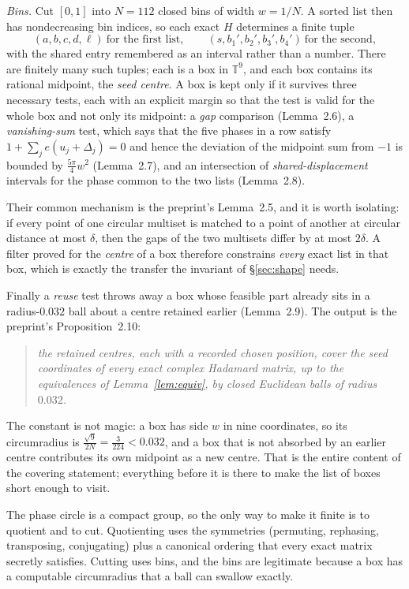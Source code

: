 \documentclass[11pt]{article}
\theoremstyle{definition}
\theoremstyle{plain}
\theoremstyle{definition}
\newenvironment{claim}{\begin{quote}\itshape}{\end{quote}}
\begin{document}
\emph{Bins.} Cut $[0,1]$ into $N=112$ closed bins of width $w=1/N$. A sorted list then has
nondecreasing bin indices, so each exact $H$ determines a finite tuple
\[
(a,b,c,d,\ell)\ \text{for the first list},\qquad (s,b_1',b_2',b_3',b_4')\ \text{for the second},
\]
with the shared entry remembered as an interval rather than a number. There are finitely many such
tuples; each is a box in $\mathbb T^9$, and each box contains its rational midpoint, the \emph{seed
centre}. A box is kept only if it survives three necessary tests, each with an explicit margin so
that the test is valid for the whole box and not only its midpoint:
a \emph{gap} comparison (Lemma~2.6), a \emph{vanishing-sum} test, which says that the five phases in
a row satisfy $1+\sum_j e(u_j+\Delta_j)=0$ and hence the deviation of the midpoint sum from $-1$ is
bounded by $\tfrac{5\pi}{4}w^2$ (Lemma~2.7), and an intersection of \emph{shared-displacement}
intervals for the phase common to the two lists (Lemma~2.8).

Their common mechanism is the preprint's Lemma~2.5, and it is worth isolating: if every point of one
circular multiset is matched to a point of another at circular distance at most $\delta$, then the
gaps of the two multisets differ by at most $2\delta$. A filter proved for the \emph{centre} of a box
therefore constrains \emph{every} exact list in that box, which is exactly the transfer the invariant
of \S\ref{sec:shape} needs.

Finally a \emph{reuse} test throws away a box whose feasible part already sits in a radius-$0.032$
ball about a centre retained earlier (Lemma~2.9). The output is the preprint's Proposition~2.10:

\begin{claim}
the retained centres, each with a recorded chosen position, cover the seed coordinates of every exact
complex Hadamard matrix, up to the equivalences of Lemma~\ref{lem:equiv}, by closed Euclidean balls of
radius $0.032$.
\end{claim}

The constant is not magic: a box has side $w$ in nine coordinates, so its circumradius is
$\tfrac{\sqrt 9}{2N}=\tfrac{3}{224}<0.032$, and a box that is not absorbed by an earlier centre
contributes its own midpoint as a new centre. That is the entire content of the covering statement;
everything before it is there to make the list of boxes short enough to visit.

\begin{ideabox}
The phase circle is a compact group, so the only way to make it finite is to quotient and to cut.
Quotienting uses the symmetries (permuting, rephasing, transposing, conjugating) plus a canonical
ordering that every exact matrix secretly satisfies. Cutting uses bins, and the bins are legitimate
because a box has a computable circumradius that a ball can swallow exactly.
\end{ideabox}
\end{document}

